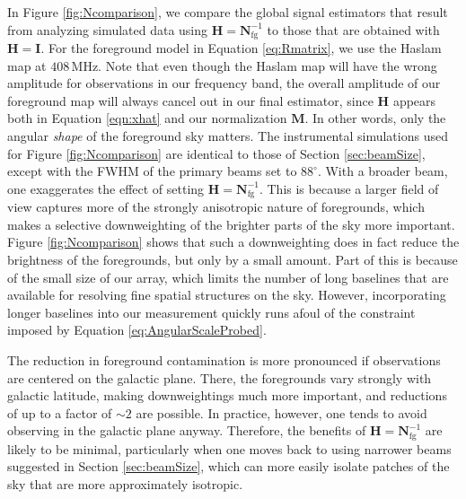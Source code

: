 \documentclass[twocolumn,apj,numberedappendix]{emulateapj}
\newcommand{\Hmat}{\mathbf{H}}
\newcommand{\Nfg}{\mathbf{N}_{\textrm{fg}}}
\newcommand{\M}{\mathbf{M}}
\begin{document}
In Figure \ref{fig:Ncomparison}, we compare the global signal estimators that result from analyzing simulated data using $\Hmat = \Nfg^{-1}$ to those that are obtained with $\Hmat = \mathbf{I}$. For the foreground model in Equation \eqref{eq:Rmatrix}, we use the Haslam map at $408\,\textrm{MHz}$. Note that even though the Haslam map will have the wrong amplitude for observations in our frequency band, the overall amplitude of our foreground map will always cancel out in our final estimator, since $\Hmat$ appears both in Equation \eqref{eqn:xhat} and our normalization $\M$. In other words, only the angular \emph{shape} of the foreground sky matters. The instrumental simulations used for Figure \ref{fig:Ncomparison} are identical to those of Section \ref{sec:beamSize}, except with the FWHM of the primary beams set to $88^\circ$. With a broader beam, one exaggerates the effect of setting $\Hmat = \Nfg^{-1}$. This is because a larger field of view captures more of the strongly anisotropic nature of foregrounds, which makes a selective downweighting of the brighter parts of the sky more important. Figure \ref{fig:Ncomparison} shows that such a downweighting does in fact reduce the brightness of the foregrounds, but only by a small amount. Part of this is because of the small size of our array, which limits the number of long baselines that are available for resolving fine spatial structures on the sky. However, incorporating longer baselines into our measurement quickly runs afoul of the constraint imposed by Equation \eqref{eq:AngularScaleProbed}.

The reduction in foreground contamination is more pronounced if observations are centered on the galactic plane. There, the foregrounds vary strongly with galactic latitude, making downweightings much more important, and reductions of up to a factor of $\sim 2$ are possible. In practice, however, one tends to avoid observing in the galactic plane anyway. Therefore, the benefits of $\Hmat = \Nfg^{-1}$ are likely to be minimal, particularly when one moves back to using narrower beams suggested in Section \ref{sec:beamSize}, which can more easily isolate patches of the sky that are more approximately isotropic.
\end{document}
